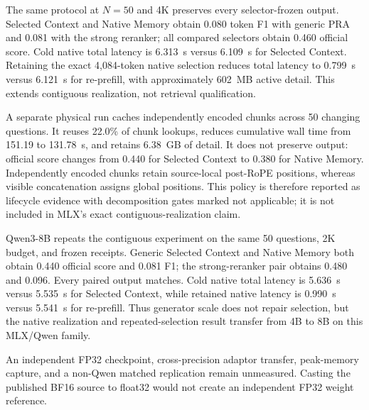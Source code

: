 \documentclass[10pt]{article}
\begin{document}
The same protocol at $N=50$ and 4K preserves every selector-frozen output.
Selected Context and Native Memory obtain 0.080 token F1 with generic PRA and
0.081 with the strong reranker; all compared selectors obtain 0.460 official
score. Cold native total latency is 6.313~s versus 6.109~s for Selected
Context. Retaining the exact 4,084-token native selection reduces total latency
to 0.799~s versus 6.121~s for re-prefill, with approximately 602~MB active
detail. This extends contiguous realization, not retrieval qualification.

A separate physical run caches independently encoded chunks across 50 changing
questions. It reuses 22.0\% of chunk lookups, reduces cumulative wall time from
151.19 to 131.78~s, and retains 6.38~GB of detail. It does not preserve output:
official score changes from 0.440 for Selected Context to 0.380 for Native
Memory. Independently encoded chunks retain source-local post-RoPE positions,
whereas visible concatenation assigns global positions. This policy is therefore
reported as lifecycle evidence with decomposition gates marked not applicable;
it is not included in MLX's exact contiguous-realization claim.

Qwen3-8B repeats the contiguous experiment on the same 50 questions, 2K
budget, and frozen receipts. Generic Selected Context and Native Memory both
obtain 0.440 official score and 0.081 F1; the strong-reranker pair obtains
0.480 and 0.096. Every paired output matches. Cold native total latency is
5.636~s versus 5.535~s for Selected Context, while retained native latency is
0.990~s versus 5.541~s for re-prefill. Thus generator scale does not repair
selection, but the native realization and repeated-selection result transfer
from 4B to 8B on this MLX/Qwen family.

An independent FP32 checkpoint, cross-precision adaptor transfer, peak-memory
capture, and a non-Qwen matched replication remain unmeasured. Casting the
published BF16 source to float32 would not create an independent FP32 weight
reference.
\end{document}
